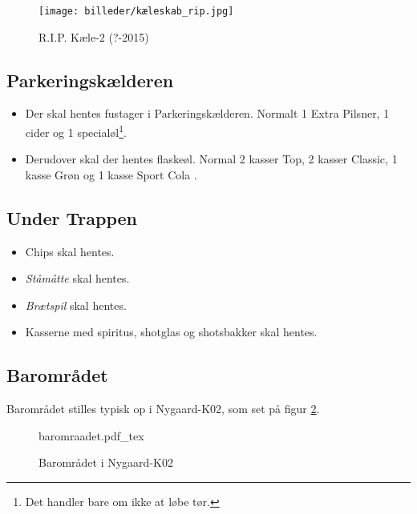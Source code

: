 \begin{figure}[H]
	\centering
	\texttt{[image: billeder/kæleskab\_rip.jpg]}
	\caption{R.I.P. Kæle-2 (?-2015)}
	\label{fig:køleskab-rip}
\end{figure}

\subsection{Parkeringskælderen}
\label{sec:pre:hopper}

\begin{itemize}
	\item Der skal hentes fustager i Parkeringskælderen. Normalt 1
	Extra Pilsner, 1 cider og 1 specialøl\footnote[1]{\label{note1}Det handler bare om ikke at løbe
	tør.}.
	\item Derudover skal der hentes flaskeøl. Normal 2 kasser Top, 2 kasser Classic,
	1 kasse Grøn og 1 kasse Sport Cola \footnotemark[1].
\end{itemize}

\subsection{Under Trappen}
\label{sec:pre:under-trappen}

\begin{itemize}
	\item Chips skal hentes.
	\item \textit{Ståmåtte} skal hentes.
	\item \textit{Brætspil} skal hentes.
	\item Kasserne med spiritus, shotglas og shotsbakker skal hentes.
\end{itemize}

\subsection{Barområdet}
\label{sec:pre:baromradet}

Barområdet stilles typisk op i Nygaard-K02, som set på figur \ref{fig:baromraadet}.

\begin{figure}[H]
	\centering
	\def\svgwidth{\columnwidth}
	{\small{baromraadet.pdf_tex}}
	\caption{Barområdet i Nygaard-K02}
	\label{fig:baromraadet}
\end{figure}

